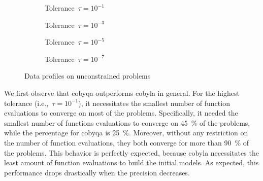 \begin{figure}[ht]
    \centering
    \begin{subfigure}[b]{0.49\textwidth}
        \centering
        \caption{Tolerance~$\tau = 10^{-1}$}
    \end{subfigure}
    \hfill
    \begin{subfigure}[b]{0.49\textwidth}
        \centering
        \caption{Tolerance~$\tau = 10^{-3}$}
    \end{subfigure}
    \begin{subfigure}[b]{0.49\textwidth}
        \centering
        \caption{Tolerance~$\tau = 10^{-5}$}
    \end{subfigure}
    \hfill
    \begin{subfigure}[b]{0.49\textwidth}
        \centering
        \caption{Tolerance~$\tau = 10^{-7}$}
    \end{subfigure}
    \caption{Data profiles on unconstrained problems}
    \label{fig:data-unconstrained-problems}
\end{figure}

We first observe that \gls{cobyqa} outperforms \gls{cobyla} in general.
For the highest tolerance (i.e.,~$\tau = 10^{-1}$), it necessitates the smallest number of function evaluations to converge on most of the problems.
Specifically, it needed the smallest number of functions evaluations to converge on \SI{45}{\percent} of the problems, while the percentage for \gls{cobyqa} is \SI{25}{\percent}.
Moreover, without any restriction on the number of function evaluations, they both converge for more than \SI{90}{\percent} of the problems.
This behavior is perfectly expected, because \gls{cobyla} necessitates the least amount of function evaluations to build the initial models.
As expected, this performance drops drastically when the precision decreases.

